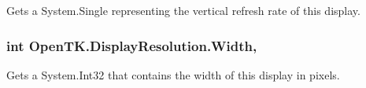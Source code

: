 Gets a System.\-Single representing the vertical refresh rate of this display. 

\hypertarget{class_open_t_k_1_1_display_resolution_ae2f5a42e23f49e4c1fd3c67714b9a259}{
\subsubsection[{Width}]{\setlength{\rightskip}{0pt plus 5cm}int Open\-T\-K.\-Display\-Resolution.\-Width\hspace{0.3cm}{\ttfamily [get]}, {\ttfamily [set]}}}\label{class_open_t_k_1_1_display_resolution_ae2f5a42e23f49e4c1fd3c67714b9a259}


Gets a System.\-Int32 that contains the width of this display in pixels.

